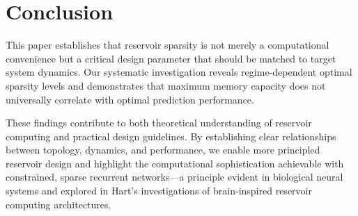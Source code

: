 \documentclass[11pt,a4paper]{article}
\begin{document}
\section{Conclusion}

This paper establishes that reservoir sparsity is not merely a computational convenience but a critical design parameter that should be matched to target system dynamics. Our systematic investigation reveals regime-dependent optimal sparsity levels and demonstrates that maximum memory capacity does not universally correlate with optimal prediction performance.

These findings contribute to both theoretical understanding of reservoir computing and practical design guidelines. By establishing clear relationships between topology, dynamics, and performance, we enable more principled reservoir design and highlight the computational sophistication achievable with constrained, sparse recurrent networks—a principle evident in biological neural systems and explored in Hart's investigations of brain-inspired reservoir computing architectures.
\end{document}
